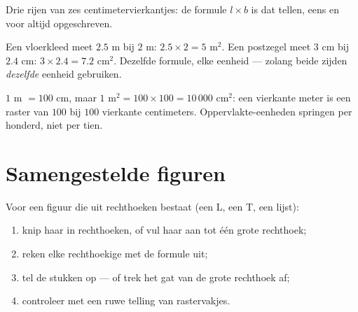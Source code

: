 \begin{omfigure}

{\small Drie rijen van zes centimetervierkantjes: de formule $l \times b$ is
dat tellen, eens en voor altijd opgeschreven.}
\end{omfigure}

\begin{example}\label{ex:g5:areas:rectangle}
Een vloerkleed meet $2.5$ m bij $2$ m:  $2.5 \times 2 = 5$ m$^2$.
Een postzegel meet $3$ cm bij $2.4$ cm:  $3 \times 2.4 = 7.2$
cm$^2$. Dezelfde formule, elke eenheid --- zolang beide zijden \emph{dezelfde}
eenheid gebruiken.
\end{example}

\begin{example}\label{ex:g5:areas:units}
$1$ m $= 100$ cm, maar $1$ m$^2 = 100 \times 100 = 10\,000$ cm$^2$: een
vierkante meter is een raster van $100$ bij $100$ vierkante centimeters.
Oppervlakte-eenheden springen per honderd, niet per tien.
\end{example}

\section{Samengestelde figuren}

\begin{method}\label{met:g5:areas:composite}
Voor een figuur die uit rechthoeken bestaat (een L, een T, een lijst):
\begin{enumerate}
  \item knip haar in rechthoeken, of vul haar aan tot één grote rechthoek;
  \item reken elke rechthoekige  met de formule uit;
  \item tel de stukken op --- of trek het gat van de grote rechthoek af;
  \item controleer met een ruwe telling van rastervakjes.
\end{enumerate}
\end{method}

